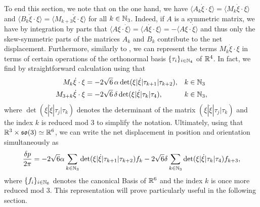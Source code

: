 To end this section, we note that on the one hand, we have $\langle A_k \dot{\xi} \cdot \xi \rangle = \langle M_k \dot{\xi} \cdot \xi \rangle$ and $\langle B_k \dot{\xi} \cdot \xi \rangle = \langle M_{k + 3} \dot{\xi} \cdot \xi \rangle$ for all $k \in \mathbb{N}_3$. Indeed, if $A$ is a symmetric matrix, we have by integration by parts that $\langle A \xi \cdot \dot{\xi} \rangle = \langle A \dot{\xi} \cdot \xi \rangle = - \langle A \xi \cdot \dot{\xi} \rangle $ and thus only the skew-symmetric parts of the matrices $A_k$ and $B_k$ contribute to the net displacement. Furthermore, similarly to \cite{Alouges2017}, we can represent the terms $ M_k \dot{\xi} \cdot \xi$ in terms of certain operations of the orthonormal basis $\{\tau_i\}_{i \in \mathbb{N}_4}$ of $\mathbb{R}^4$. In fact, we find by straightforward calculation using  that
\begin{align}
  M_k \dot{\xi} \cdot \xi &= - 2 \sqrt{6} \,\alpha \det( \xi | \dot{\xi} | \tau_{k+1} | \tau_{k+2}), & & k \in \mathbb{N}_3 \\
  M_{3 + k} \dot{\xi} \cdot \xi &= - 2 \sqrt{6} \,\delta \det ( \xi | \dot{\xi} | \tau_{k} | \tau_{4}), & & k \in \mathbb{N}_3,
\end{align}
where $\det(\xi|\dot{\xi}|\tau_j|\tau_k)$ denotes the determinant of the matrix $(\xi|\dot{\xi}|\tau_j |\tau_k)$ and the index $k$ is reduced mod 3 to simplify the notation. Ultimately, using that $\mathbb{R}^3 \times \mathfrak{so}(3) \simeq \mathbb{R}^6$, we can write the net displacement in position and orientation simultaneously as
\begin{equation}
\label{eq: net displacement}
\frac{\delta p}{2 \pi}= - 2  \sqrt{6} \alpha \sum_{k \in \mathbb{N}_3} \det( \xi | \dot{\xi} | \tau_{k+1} | \tau_{k+2}) f_k  - 2  \sqrt{6} \delta \sum_{k \in \mathbb{N}_3} \det ( \xi | \dot{\xi} | \tau_{k} | \tau_{4}) f_{k + 3},
\end{equation}
where $\{f_i\}_{i \in \mathbb{N}_6}$ denotes the canonical Basis of $\mathbb{R}^6$ and the index $k$ is once more reduced mod 3. This representation will prove particularly useful in the following section.